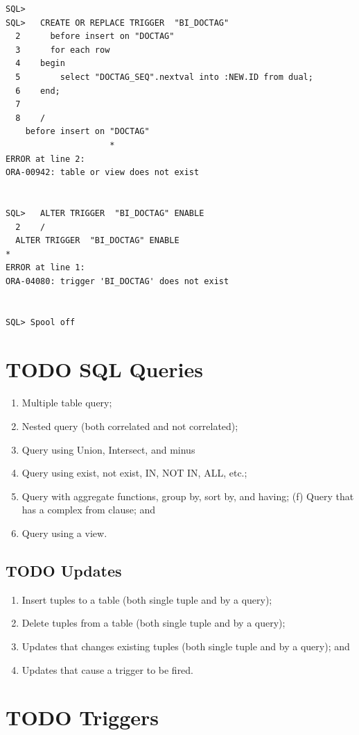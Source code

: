 \documentclass[11pt]{article}
\begin{document}
\begin{verbatim}
SQL> 
SQL>   CREATE OR REPLACE TRIGGER  "BI_DOCTAG"
  2      before insert on "DOCTAG"
  3      for each row
  4    begin
  5        select "DOCTAG_SEQ".nextval into :NEW.ID from dual;
  6    end;
  7  
  8    /
    before insert on "DOCTAG"
                     *
ERROR at line 2:
ORA-00942: table or view does not exist 


SQL>   ALTER TRIGGER  "BI_DOCTAG" ENABLE
  2    /
  ALTER TRIGGER  "BI_DOCTAG" ENABLE
*
ERROR at line 1:
ORA-04080: trigger 'BI_DOCTAG' does not exist 


SQL> Spool off
\end{verbatim}
\section{\textbf{TODO} SQL Queries}
\label{sec-7}


\begin{enumerate}
\item Multiple table query;
\item Nested query (both correlated and not correlated);
\item Query using Union, Intersect, and minus
\item Query using exist, not exist, IN, NOT IN, ALL, etc.;
\item Query with aggregate functions, group by, sort by, and having; (f) Query that has a complex from clause; and
\item Query using a view.
\end{enumerate}
\subsection{\textbf{TODO} Updates}
\label{sec-7-1}


\begin{enumerate}
\item Insert tuples to a table (both single tuple and by a query);
\item Delete tuples from a table (both single tuple and by a query);
\item Updates that changes existing tuples (both single tuple and by a query); and
\item Updates that cause a trigger to be fired.
\end{enumerate}
\section{\textbf{TODO} Triggers}
\label{sec-8}
\end{document}
